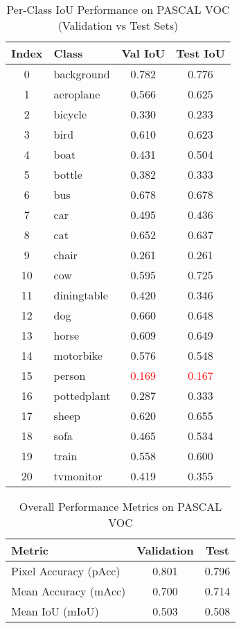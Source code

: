 \begin{table}[th]
\centering
\caption{Per-Class IoU Performance on PASCAL VOC (Validation vs Test Sets)}
\begin{tabular}{|c|l|c|c|}
\hline
\textbf{Index} & \textbf{Class} & \textbf{Val IoU} & \textbf{Test IoU} \\ \hline
0  & background   & 0.782 & 0.776 \\
1  & aeroplane    & 0.566 & 0.625 \\
2  & bicycle      & 0.330 & 0.233 \\
3  & bird         & 0.610 & 0.623 \\
4  & boat         & 0.431 & 0.504 \\
5  & bottle       & 0.382 & 0.333 \\
6  & bus          & 0.678 & 0.678 \\
7  & car          & 0.495 & 0.436 \\
8  & cat          & 0.652 & 0.637 \\
9  & chair        & 0.261 & 0.261 \\
10 & cow          & 0.595 & 0.725 \\
11 & diningtable  & 0.420 & 0.346 \\
12 & dog          & 0.660 & 0.648 \\
13 & horse        & 0.609 & 0.649 \\
14 & motorbike    & 0.576 & 0.548 \\
15 & person       & \textcolor{red}{0.169} & \textcolor{red}{0.167} \\
16 & pottedplant  & 0.287 & 0.333 \\
17 & sheep        & 0.620 & 0.655 \\
18 & sofa         & 0.465 & 0.534 \\
19 & train        & 0.558 & 0.600 \\
20 & tvmonitor    & 0.419 & 0.355 \\ \hline
\end{tabular}
\label{tab:per_class_iou_comparison}
\end{table}

\begin{table}[ht]
\centering
\caption{Overall Performance Metrics on PASCAL VOC}
\begin{tabular}{|l|c|c|}
\hline
\textbf{Metric} & \textbf{Validation} & \textbf{Test} \\ \hline
Pixel Accuracy (pAcc) & 0.801 & 0.796 \\
Mean Accuracy (mAcc)  & 0.700 & 0.714 \\
Mean IoU (mIoU)       & 0.503 & 0.508 \\ \hline
\end{tabular}
\label{tab:summarized_results}
\end{table}


